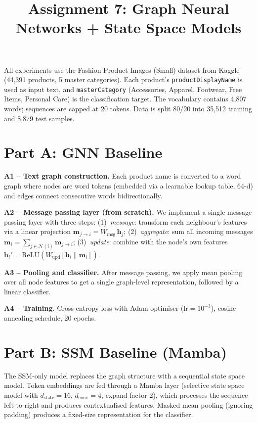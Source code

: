\documentclass[11pt,a4paper]{article}
\title{Assignment 7: Graph Neural Networks + State Space Models}
\author{}
\date{}
\begin{document}
\maketitle
\vspace{-1.5cm}

All experiments use the Fashion Product Images (Small) dataset from Kaggle (44,391 products, 5 master categories). Each product's \texttt{productDisplayName} is used as input text, and \texttt{masterCategory} (Accessories, Apparel, Footwear, Free Items, Personal Care) is the classification target. The vocabulary contains 4,807 words; sequences are capped at 20 tokens. Data is split 80/20 into 35,512 training and 8,879 test samples.

\section{Part A: GNN Baseline}

\textbf{A1 -- Text graph construction.} Each product name is converted to a word graph where nodes are word tokens (embedded via a learnable lookup table, 64-d) and edges connect consecutive words bidirectionally.

\textbf{A2 -- Message passing layer (from scratch).} We implement a single message passing layer with three steps: (1)~\emph{message}: transform each neighbour's features via a linear projection $\mathbf{m}_{j \to i} = W_\text{msg} \, \mathbf{h}_j$; (2)~\emph{aggregate}: sum all incoming messages $\mathbf{m}_i = \sum_{j \in \mathcal{N}(i)} \mathbf{m}_{j \to i}$; (3)~\emph{update}: combine with the node's own features $\mathbf{h}_i' = \text{ReLU}(W_\text{upd} [\mathbf{h}_i \| \mathbf{m}_i])$.

\textbf{A3 -- Pooling and classifier.} After message passing, we apply mean pooling over all node features to get a single graph-level representation, followed by a linear classifier.

\textbf{A4 -- Training.} Cross-entropy loss with Adam optimiser ($\text{lr}=10^{-3}$), cosine annealing schedule, 20 epochs.

\section{Part B: SSM Baseline (Mamba)}

The SSM-only model replaces the graph structure with a sequential state space model. Token embeddings are fed through a Mamba layer (selective state space model with $d_\text{state}=16$, $d_\text{conv}=4$, expand factor 2), which processes the sequence left-to-right and produces contextualised features. Masked mean pooling (ignoring padding) produces a fixed-size representation for the classifier.
\end{document}
